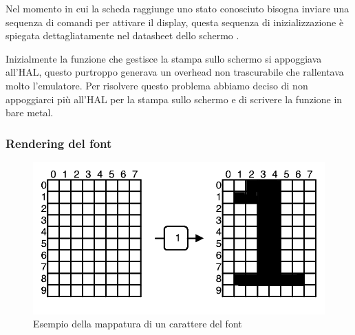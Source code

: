 \documentclass[a4paper]{article}
\begin{document}
Nel momento in cui la scheda raggiunge uno stato conosciuto bisogna inviare una sequenza di
comandi per attivare il display, questa sequenza di inizializzazione è spiegata dettagliatamente
nel datasheet dello schermo \cite{ili9341}.

Inizialmente la funzione che gestisce la stampa sullo schermo si appoggiava all'HAL, questo
purtroppo generava un overhead non trascurabile che rallentava molto l'emulatore. Per risolvere
questo problema abbiamo deciso di non appoggiarci più all'HAL per la stampa sullo schermo e
di scrivere la funzione in bare metal.

%
%
%

\subsubsection{Rendering del font}

\begin{figure}[h!t]
    \begin{center}
        \includegraphics[scale=0.5]{./figures/matrix_font.pdf}
    \end{center}
    \caption{Esempio della mappatura di un carattere del font}
    \label{fig:matrix_font}
\end{figure}
\end{document}
